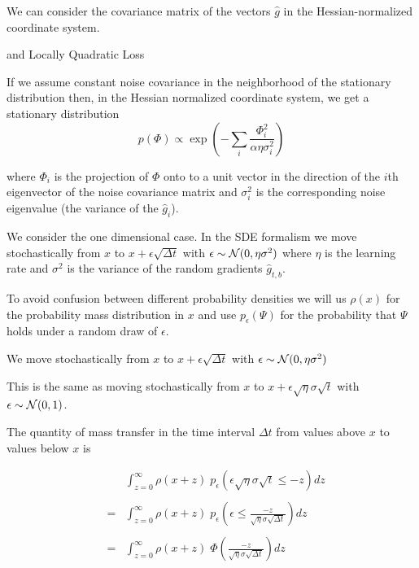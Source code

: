 {\vfill
We can consider the covariance matrix of the vectors $\hat{g}$ in the Hessian-normalized coordinate system.

{and Locally Quadratic Loss}

If we assume constant noise covariance in the neighborhood of the stationary distribution then, in the Hessian normalized
coordinate system, we get a stationary distribution
$$p(\Phi) \propto \exp\left(-\sum_i \frac{{\Phi_i^2}}{\alpha\eta\sigma_i^2}\right)$$

\vfill
where $\Phi_i$ is the projection of $\Phi$ onto to a unit vector in the direction of the $i$th eigenvector of the noise covariance matrix and $\sigma^2_i$
is the corresponding noise eigenvalue (the variance of the $\hat{g}_i$).



{\Large
We consider the one dimensional case. In the SDE formalism we move stochastically from $x$ to $x + \epsilon \sqrt{\Delta t}$ with $\epsilon \sim {\cal N}(0,\eta\sigma^2)$
where $\eta$ is the learning rate and $\sigma^2$ is the variance of the random gradients $\hat{g}_{t,b}$.

\vfill
To avoid confusion between different probability densities we will us $\rho(x)$ for the probability mass distribution in $x$ and use $p_\epsilon(\Psi)$
for the probability that $\Psi$ holds under a random draw of $\epsilon$.

}

{\Large

We move stochastically from $x$ to $x + \epsilon \sqrt{\Delta t}$ with $\epsilon \sim {\cal N}(0,\eta\sigma^2)$

\vfill
This is the same as moving stochastically from $x$ to $x + \epsilon\sqrt{\eta}\sigma\sqrt{t}$ with $\epsilon \sim {\cal N}(0,1)$.

\vfill
The quantity of mass transfer in the time interval $\Delta t$ from values above $x$ to values below $x$ is


\begin{eqnarray*}
& & \int_{z = 0}^\infty  \rho(x + z)\;p_\epsilon(\epsilon\sqrt{\eta}\sigma\sqrt{t} \leq -z) dz  \\
\\
& = & \int_{z = 0}^\infty  \rho(x + z)\;p_\epsilon\left(\epsilon \leq \frac{-z}{\sqrt{\eta}\sigma\sqrt{\Delta t}}\right) dz  \\
\\
& =  & \int_{z = 0}^\infty \rho(x+z)\;\Phi\left(\frac{-z}{\sqrt{\eta}\sigma\sqrt{\Delta t}}\right) dz
\end{eqnarray*}

}}
